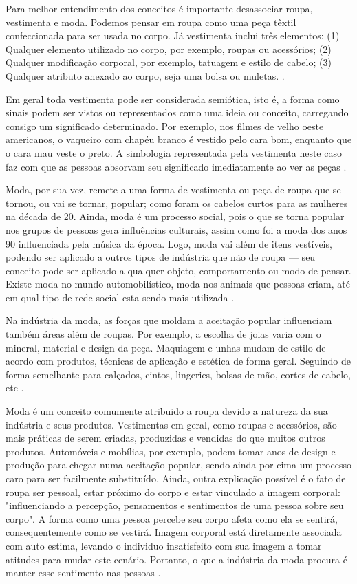 \documentclass[12pt]{report}
\begin{document}
Para melhor entendimento dos conceitos é importante desassociar roupa, vestimenta e moda. Podemos pensar em roupa como uma peça têxtil confeccionada para ser usada no corpo. Já vestimenta inclui três elementos: (1) Qualquer elemento utilizado no corpo, por exemplo, roupas ou acessórios; (2) Qualquer modificação corporal, por exemplo, tatuagem e estilo de cabelo; (3) Qualquer atributo anexado ao corpo, seja uma bolsa ou muletas. \cite{key}.

Em geral toda vestimenta pode ser considerada semiótica, isto é, a forma como sinais podem ser vistos ou representados como uma ideia ou conceito, carregando consigo um significado determinado. Por exemplo, nos filmes de velho oeste americanos, o vaqueiro com chapéu branco é vestido pelo cara bom, enquanto que o cara mau veste o preto. A simbologia representada pela vestimenta neste caso faz com que as pessoas absorvam seu significado imediatamente ao ver as peças \cite{key}.

Moda, por sua vez, remete a uma forma de vestimenta ou peça de roupa que se tornou, ou vai se tornar, popular; como foram os cabelos curtos para as mulheres na década de 20. Ainda, moda é um processo social, pois o que se torna popular nos grupos de pessoas gera influências culturais, assim como foi a moda dos anos 90 influenciada pela música da época. Logo, moda vai além de itens vestíveis, podendo ser aplicado a outros tipos de indústria que não de roupa --- seu conceito pode ser aplicado a qualquer objeto, comportamento ou modo de pensar. Existe moda no mundo automobilístico, moda nos animais que pessoas criam, até em qual tipo de rede social esta sendo mais utilizada \cite{key}.

Na indústria da moda, as forças que moldam a aceitação popular influenciam também áreas além de roupas. Por exemplo, a escolha de joias varia com o mineral, material e design da peça. Maquiagem e unhas mudam de estilo de acordo com produtos, técnicas de aplicação e estética de forma geral. Seguindo de forma semelhante para calçados, cintos, lingeries, bolsas de mão, cortes de cabelo, etc \cite{key}.

Moda é um conceito comumente atribuido a roupa devido a natureza da sua indústria e seus produtos. Vestimentas em geral, como roupas e acessórios, são mais práticas de serem criadas, produzidas e vendidas do que muitos outros produtos. Automóveis e mobílias, por exemplo, podem tomar anos de design e produção para chegar numa aceitação popular, sendo ainda por cima um processo caro para ser facilmente substituído. Ainda, outra explicação possível é o fato de roupa ser pessoal, estar próximo do corpo e estar vinculado a imagem corporal: "influenciando a percepção, pensamentos e sentimentos de uma pessoa sobre seu corpo". A forma como uma pessoa percebe seu corpo afeta como ela se sentirá, consequentemente como se vestirá. Imagem corporal está diretamente associada com auto estima, levando o individuo insatisfeito com sua imagem a tomar atitudes para mudar este cenário. Portanto, o que a indústria da moda procura é manter esse sentimento nas pessoas \cite{key}.
\end{document}
